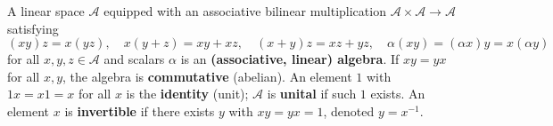 A linear space $\mathcal{A}$ equipped with an associative bilinear multiplication $\mathcal{A} \times \mathcal{A} \to \mathcal{A}$ satisfying $$(xy)z = x(yz), \quad x(y+z) = xy + xz, \quad (x+y)z = xz + yz, \quad \alpha(xy) = (\alpha x)y = x(\alpha y)$$ for all $x, y, z \in \mathcal{A}$ and scalars $\alpha$ is an \textbf{(associative, linear) algebra}. If $xy = yx$ for all $x, y$, the algebra is \textbf{commutative} (abelian). An element $1$ with $1x = x1 = x$ for all $x$ is the \textbf{identity} (unit); $\mathcal{A}$ is \textbf{unital} if such $1$ exists. An element $x$ is \textbf{invertible} if there exists $y$ with $xy = yx = 1$, denoted $y = x^{-1}$.
